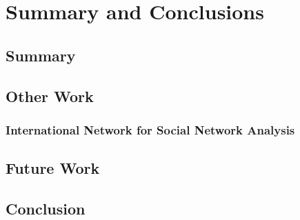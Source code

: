 \chapter{Summary and Conclusions}\label{ch:Conclusion}

\section{Summary}

\section{Other Work}

\subsection{International Network for Social Network Analysis}

\section{Future Work}

\section{Conclusion}
